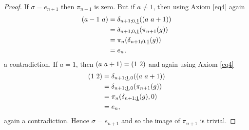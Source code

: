 \begin{proof}
If $\sigma = e_{n+1}$ then $\pi_{n+1}$ is zero. But if $a \neq 1$, then using Axiom \ref{eq4} again
  \begin{align*}
    ( a-1 \, \, a ) &= \delta_{n+1;0,\underline{1}}(( a \, \, a+1 )) \\
    &= \delta_{n+1;0,\underline{1}}(\pi_{n+1}(g)) \\
    &= \pi_n(\delta_{n+1;0,\underline{1}}(g)) \\
    &= e_n,
  \end{align*}
a contradiction. If $a = 1$, then $( a \, \, a+1 ) = ( 1 \, \, 2 )$ and again using Axiom \ref{eq4}
  \begin{align*}
    ( 1 \, \, 2 ) &= \delta_{n+1;\underline{1},0}(( a \, \, a+1 )) \\
    &= \delta_{n+1;\underline{1},0}(\pi_{n+1}(g)) \\
    &= \pi_n(\delta_{n+1;\underline{1}}(g),0) \\
    &= e_n,
  \end{align*}
again a contradiction. Hence $\sigma = e_{n+1}$ and so the image of $\pi_{n+1}$ is trivial.





\end{proof}
